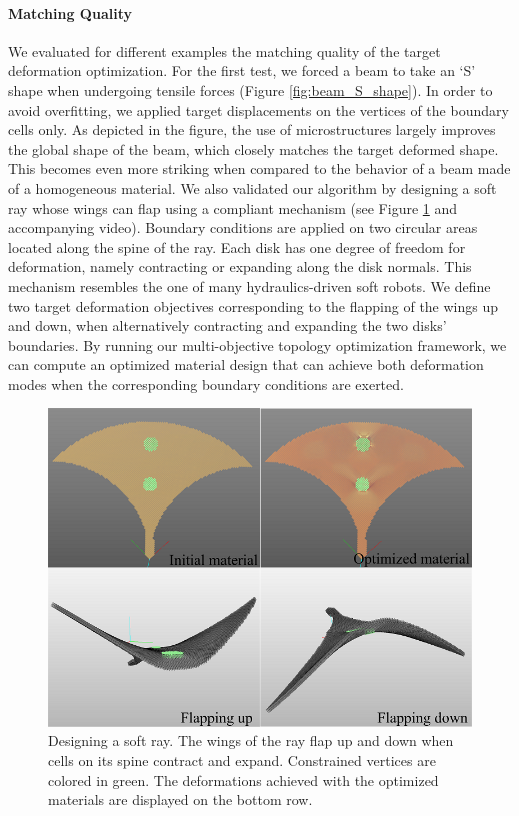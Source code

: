 \paragraph{Matching Quality}
	We evaluated for different examples the matching quality of the target deformation optimization.
	For the first test, we forced a beam to take an `S' shape when undergoing tensile forces (Figure \ref{fig:beam_S_shape}). In order to avoid overfitting, we applied target displacements on the vertices of the boundary cells only. As depicted in the figure, the use of microstructures largely improves the global shape of the beam, which closely matches the target deformed shape. This becomes even more striking when compared to the behavior of a beam made of a homogeneous material.
		We also validated our algorithm by designing a soft ray whose wings can flap using a compliant mechanism (see Figure \ref{fig:ray} and accompanying video). Boundary conditions are applied on two circular areas located along the spine of the ray. Each disk has one degree of freedom for deformation, namely contracting or expanding along the disk normals. This mechanism resembles the one of many hydraulics-driven soft robots. We define two target deformation objectives corresponding to the flapping of the wings up and down, when alternatively contracting and expanding the two disks' boundaries. By running our multi-objective topology optimization framework, we can compute an optimized material design that can achieve both deformation modes when the corresponding boundary conditions are exerted.

\begin{figure}[t]
	\centering
	\includegraphics[width=.6\linewidth]{images/ray.png}
	\caption{Designing a soft ray. The wings of the ray flap up and down when cells on its spine contract and expand.
	Constrained vertices are colored in green.
	The deformations achieved with the optimized materials are displayed on the bottom row.}
	\label{fig:ray}
\end{figure}
